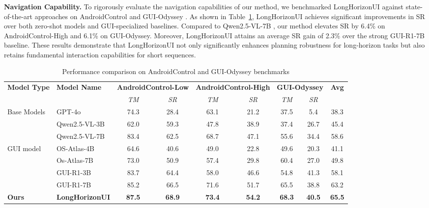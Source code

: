 \documentclass{article} %
\newcommand{\mypara}[1]{\vspace{0.4em}\noindent\textbf{#1}\hspace{0.2cm}}
\begin{document}
\mypara{Navigation Capability.} To rigorously evaluate the navigation capabilities of our method, we benchmarked LongHorizonUI against state-of-the-art approaches on AndroidControl \citep{NEURIPS2024_androidcontrol} and GUI-Odyssey \citep{2024_gui_odyssey}. As shown in Table~\ref{tab:Navigation_performance}, LongHorizonUI achieves significant improvements in SR over both zero-shot models and GUI-specialized baselines. Compared to Qwen2.5-VL-7B , our method elevates SR by 6.4\% on AndroidControl-High and 6.1\% on GUI-Odyssey. Moreover, LongHorizonUI attains an average SR gain of 2.3\% over the strong GUI-R1-7B baseline. These results demonstrate that LongHorizonUI not only significantly enhances planning robustness for long-horizon tasks but also retains fundamental interaction capabilities for short sequences.

\begin{table}[!ht]
\centering

\caption{Performance comparison on AndroidControl and GUI-Odyssey benchmarks}
\label{tab:Navigation_performance}
\footnotesize %
\setlength{\tabcolsep}{5.5pt} %
\begin{tabular}{@{}llccccccc@{}}
\toprule
\textbf{Model Type} & \textbf{Model Name} &
\multicolumn{2}{c}{\textbf{AndroidControl-Low}} &
\multicolumn{2}{c}{\textbf{AndroidControl-High}} &
\multicolumn{2}{c}{\textbf{GUI-Odyssey}} &
\textbf{Avg} \\
\cmidrule(lr){3-4} \cmidrule(lr){5-6} \cmidrule(l){7-8}
 & & \textit{TM} & \textit{SR} & \textit{TM} & \textit{SR} & \textit{TM} & \textit{SR} & \\
\midrule
\multirow{3}{*}{Base Models}
    & GPT-4o & 74.3 & 28.4 & 63.1 & 21.2 & 37.5 & 5.4 & 38.3 \\
    & Qwen2.5-VL-3B & 62.0 & 59.3 & 47.8 & 38.9 & 37.4 & 26.7 & 45.4 \\
    & Qwen2.5-VL-7B & 83.4 & 62.5 & 68.7 & 47.1 & 55.6 & 34.4 & 58.6 \\
\midrule
\multirow{4}{*}{GUI model}
    & OS-Atlas-4B  & 64.6 & 40.6 & 49.0 & 22.8 & 49.6 & 20.3 & 41.1 \\
    & Os-Atlas-7B & 73.0 & 50.9 & 57.4 & 29.8 & 60.4 & 27.0 & 49.8 \\
    & GUI-R1-3B  & 83.7 & 64.4 & 58.0 & 46.6 & 54.8 & 41.3 & 58.1 \\
    & GUI-R1-7B & 85.2 & 66.5 & 71.6 & 51.7 & 65.5 & 38.8 & 63.2 \\
\midrule
\textbf{Ours}
    & \textbf{LongHorizonUI} & \textbf{87.5} & \textbf{68.9} & \textbf{73.4} & \textbf{54.2} & \textbf{68.3} & \textbf{40.5} & \textbf{65.5} \\
\bottomrule
\end{tabular}

\end{table}
\end{document}
